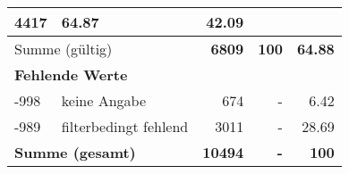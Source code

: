 \begin{longtable}{lXrrr}
       \num{4417} &
       \num[round-mode=places,round-precision=2]{64.87} &
         \num[round-mode=places,round-precision=2]{42.09} \\
     \midrule
     \multicolumn{2}{l}{Summe (gültig)} &
       \textbf{\num{6809}} &
     \textbf{\num{100}} &
       \textbf{\num[round-mode=places,round-precision=2]{64.88}} \\
     \multicolumn{5}{l}{\textbf{Fehlende Werte}}\\
       -998 &
       keine Angabe &
         \num{674} &
        - &
         \num[round-mode=places,round-precision=2]{6.42} \\
       -989 &
       filterbedingt fehlend &
         \num{3011} &
        - &
         \num[round-mode=places,round-precision=2]{28.69} \\
     \midrule
     \multicolumn{2}{l}{\textbf{Summe (gesamt)}} &
          \textbf{\num{10494}} &
        \textbf{-} &
        \textbf{\num{100}} \\
     \bottomrule
     \end{longtable}
     
